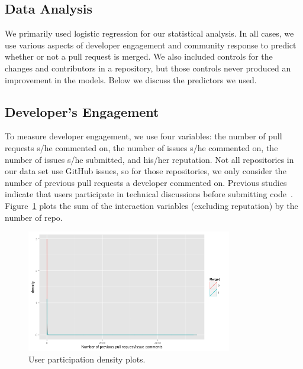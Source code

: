 \documentclass{sigchi}
\begin{document}
\subsection{Data Analysis} \label{sec:data_analysis} We primarily used logistic
regression for our statistical analysis. In all cases, we use various aspects of
developer engagement and community response to predict whether or not a pull
request is merged. We also included controls for the changes and contributors in
a repository, but those controls never produced an improvement in the models.
Below we discuss the predictors we used.

\subsection{Developer's Engagement} To measure developer engagement, we use four
variables: the number of pull requests s/he commented on, the number of issues
s/he commented on, the number of issues s/he submitted, and his/her reputation.
Not all repositories in our data set use GitHub issues, so for those
repositories, we only consider the number of previous pull requests a developer
commented on. Previous studies indicate that users participate in technical
discussions before submitting code~\cite{von_krogh_community_2003}.
Figure~\ref{fig:up} plots the sum of the interaction variables (excluding
reputation) by the number of repo.

\begin{figure}[p] \centering
\includegraphics[width=0.8\textwidth]{figures/number_comments_density_ggplot.png}
\caption{User participation density plots.} \label{fig:up} \end{figure}
\end{document}
